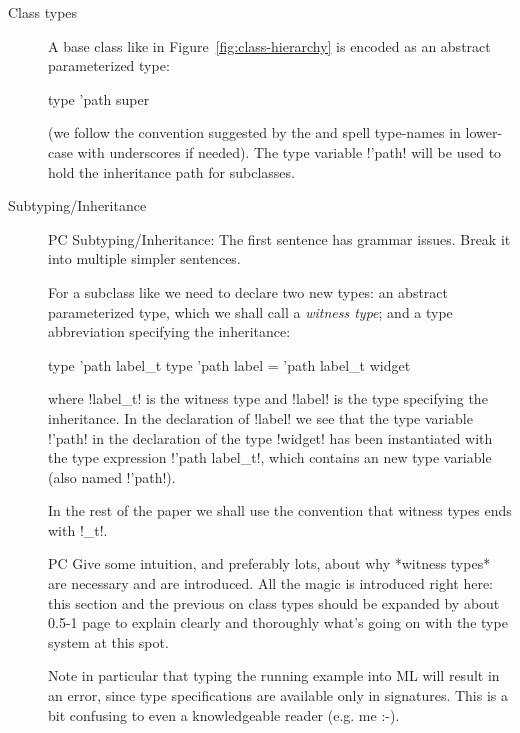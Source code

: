 \documentclass[workingdraft]{usetex-v1}
\begin{document}
\begin{description}
\item[Class types] A base class like  in
  Figure~\ref{fig:class-hierarchy} is encoded as an abstract
  parameterized type:
\begin{SMLcode}
type 'path super
\end{SMLcode}
(we follow the convention suggested by the \smlbasis and spell
type-names in lower-case with underscores if needed).  The type
variable !'path! will be used to hold the inheritance path for
subclasses.


\item[Subtyping/Inheritance] 

  \begin{ednote}{PC}
      Subtyping/Inheritance: The first sentence has grammar
  issues.  Break it into multiple simpler sentences.

  \end{ednote}

  For a subclass like 
  we need to declare two new \sml types: an abstract parameterized
  type, which we shall call a \emph{witness type}; and a type
  abbreviation specifying the inheritance:
\begin{SMLcode}
type 'path label_t
type 'path label = 
        'path label_t widget
\end{SMLcode}
where !label_t! is the witness type and !label! is the
type specifying the inheritance.  In the declaration of !label!
we see that the type variable !'path! in the declaration of the type
!widget! has been instantiated with the type expression 
!'path label_t!, which contains an new type variable (also named
!'path!).

In the rest of the paper we shall use the convention that witness
types ends with !_t!.

\begin{ednote}{PC}
    Give some intuition, and preferably lots, about why *witness
  types* are necessary and are introduced.  All the magic is
  introduced right here: this section and the previous on
  class types should be expanded by about 0.5-1 page to
  explain clearly and thoroughly what's going on with the type
  system at this spot.  
  
  Note in particular that typing the running example into ML will
  result in an error, since type specifications are available only in
  signatures.  This is a bit confusing to even a knowledgeable reader
  (e.g. me :-).
\end{ednote}


\end{description}
\end{document}
